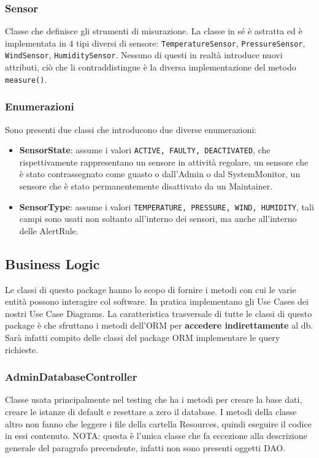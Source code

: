 \documentclass[a4paper, 11pt]{article}
\begin{document}
	\subsubsection{Sensor}
	Classe che definisce gli strumenti di misurazione. La classe in sé è astratta ed è implementata in 4 tipi diversi di sensore: \texttt{TemperatureSensor}, \texttt{PressureSensor}, \texttt{WindSensor}, \texttt{HumiditySensor}. Nessuno di questi in realtà introduce nuovi attributi, ciò che li contraddistingue è la diversa implementazione del metodo \texttt{measure()}.

	\subsubsection{Enumerazioni}
	Sono presenti due classi che introducono due diverse enumerazioni:
	\begin{itemize}
		\item \textbf{SensorState}: assume i valori \texttt{ACTIVE, FAULTY, DEACTIVATED}, che rispettivamente rappresentano un sensore in attività regolare, un sensore che è stato contrassegnato come guasto o dall'Admin o dal SystemMonitor, un sensore che è stato permanentemente disattivato da un Maintainer.
		\item \textbf{SensorType}: assume i valori \texttt{TEMPERATURE, PRESSURE, WIND, HUMIDITY}, tali campi sono usati non soltanto all'interno dei sensori, ma anche all'interno delle AlertRule.
	\end{itemize}

	\subsection{Business Logic}
	Le classi di questo package hanno lo scopo di fornire i metodi con cui le varie entità possono interagire col software. In pratica implementano gli Use Cases dei nostri Use Case Diagrams. La caratteristica trasversale di tutte le classi di questo package è che sfruttano i metodi dell'ORM per \textbf{accedere indirettamente} al db. Sarà infatti compito delle classi del package ORM implementare le query richieste.
	\subsubsection{AdminDatabaseController}
	Classe usata principalmente nel testing che ha i metodi per creare la base dati, creare le istanze di default e resettare a zero il database. I metodi della classe altro non fanno che leggere i file della cartella Resources, quindi eseguire il codice in essi contenuto. NOTA: questa è l'unica classe che fa eccezione alla descrizione generale del paragrafo precendente, infatti non sono presenti oggetti DAO.
\end{document}
